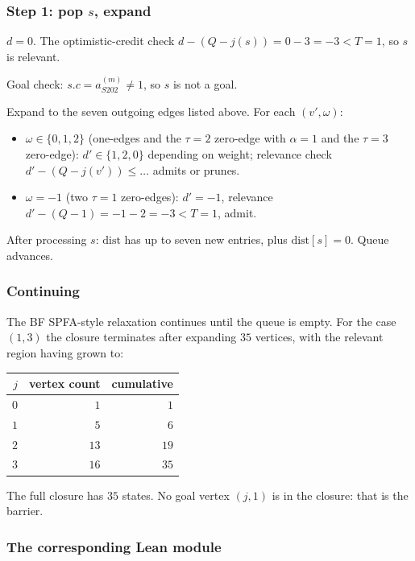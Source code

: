 \documentclass[11pt,a4paper]{article}
\theoremstyle{plain}
\theoremstyle{definition}
\newcommand{\aSat}{a_{S202}^{(m)}}
\begin{document}
\subsubsection*{Step 1: pop $s$, expand}

$d = 0$. The optimistic-credit check
$d - (Q - j(s)) = 0 - 3 = -3 < T = 1$, so $s$ is relevant.

Goal check: $s.c = \aSat \ne 1$, so $s$ is not a goal.

Expand to the seven outgoing edges listed above. For each
$(v', \omega)$:
\begin{itemize}
   \item $\omega \in \{0, 1, 2\}$ (one-edges and the $\tau = 2$
         zero-edge with $\alpha = 1$ and the $\tau = 3$ zero-edge):
         $d' \in \{1, 2, 0\}$ depending on weight; relevance check
         $d' - (Q - j(v')) \le \ldots$ admits or prunes.
   \item $\omega = -1$ (two $\tau = 1$ zero-edges): $d' = -1$,
         relevance $d' - (Q - 1) = -1 - 2 = -3 < T = 1$, admit.
\end{itemize}

After processing $s$: $\mathrm{dist}$ has up to seven new entries,
plus $\mathrm{dist}[s] = 0$. Queue advances.

\subsubsection*{Continuing}

The BF SPFA-style relaxation continues until the queue is empty.
For the case $(1, 3)$ the closure terminates after expanding $35$
vertices, with the relevant region having grown to:
\begin{center}\footnotesize
\begin{tabular}{rrr}
\toprule
$j$ & vertex count & cumulative \\
\midrule
$0$ & $1$  & $1$ \\
$1$ & $5$  & $6$ \\
$2$ & $13$ & $19$ \\
$3$ & $16$ & $35$ \\
\bottomrule
\end{tabular}
\end{center}
The full closure has $35$ states. No goal vertex $(j, 1)$ is in
the closure: that is the barrier.

\subsubsection*{The corresponding Lean module}
\end{document}
